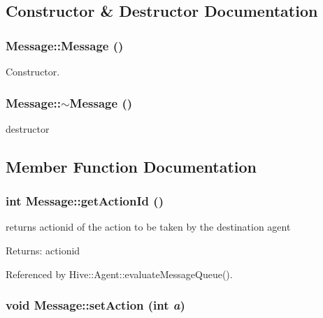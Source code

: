 \subsection{Constructor \& Destructor Documentation}
\subsubsection[Message]{\setlength{\rightskip}{0pt plus 5cm}Message::Message ()}\label{classHive_1_1Message_4fc4f717b634e66070366cb7722d7761}


Constructor. 

\subsubsection[$\sim$Message]{\setlength{\rightskip}{0pt plus 5cm}Message::$\sim$Message ()}\label{classHive_1_1Message_3f7275462831f787a861271687bcad67}


destructor 



\subsection{Member Function Documentation}
\subsubsection[getActionId]{\setlength{\rightskip}{0pt plus 5cm}int Message::getActionId ()}\label{classHive_1_1Message_b432b3eee3b03fb5b7b25b530898fa96}


returns actionid of the action to be taken by the destination agent \begin{Desc}
\item[Returns:]actionid \end{Desc}


Referenced by Hive::Agent::evaluateMessageQueue().
\subsubsection[setAction]{\setlength{\rightskip}{0pt plus 5cm}void Message::setAction (int {\em a})}\label{classHive_1_1Message_6cc1ac636810840ebeef7f78234fed93}


